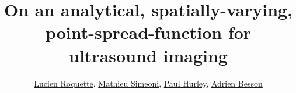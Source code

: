 

\title[EPFLIBM]{On an analytical, spatially-varying, point-spread-function for ultrasound imaging}

\author[short-author]{ %
	\href{mailto:lucien.roquette@epfl.ch}{Lucien Roquette},
	\href{mailto:mathieu.simeoni@epfl.ch}{Mathieu Simeoni},
	\href{mailto:mathieu.simeoni@epfl.ch}{Paul Hurley},
	\href{mailto:adrien.besson@epfl.ch}{Adrien Besson}	
}

